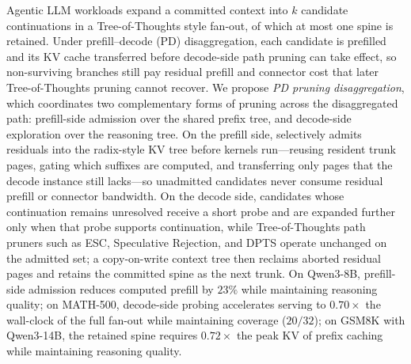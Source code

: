 Agentic LLM workloads expand a committed context into $k$ candidate continuations in a Tree-of-Thoughts style fan-out, of which at most one spine is retained.
Under prefill--decode (PD) disaggregation, each candidate is prefilled and its KV cache transferred before decode-side path pruning can take effect, so non-surviving branches still pay residual prefill and connector cost that later Tree-of-Thoughts pruning cannot recover.
We propose \emph{PD pruning disaggregation}, which coordinates two complementary forms of pruning across the disaggregated path: prefill-side admission over the shared prefix tree, and decode-side exploration over the reasoning tree.
On the prefill side, \sys selectively admits residuals into the radix-style KV tree before kernels run---reusing resident trunk pages, gating which suffixes are computed, and transferring only pages that the decode instance still lacks---so unadmitted candidates never consume residual prefill or connector bandwidth.
On the decode side, candidates whose continuation remains unresolved receive a short probe and are expanded further only when that probe supports continuation, while Tree-of-Thoughts path pruners such as ESC, Speculative Rejection, and DPTS operate unchanged on the admitted set; a copy-on-write context tree then reclaims aborted residual pages and retains the committed spine as the next trunk.
On Qwen3-8B, prefill-side admission reduces computed prefill by $23\%$ while maintaining reasoning quality; on MATH-500, decode-side probing accelerates serving to $0.70\times$ the wall-clock of the full fan-out while maintaining coverage ($20/32$); on GSM8K with Qwen3-14B, the retained spine requires $0.72\times$ the peak KV of prefix caching while maintaining reasoning quality.
